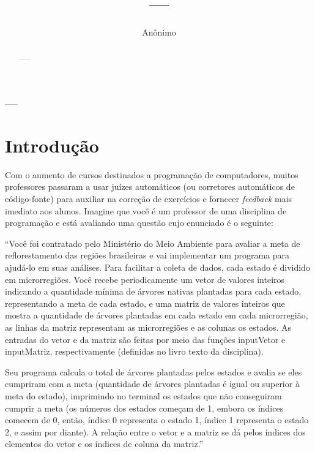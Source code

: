 \documentclass[12pt]{article}
\title{---}
\author{Anônimo}
\begin{document}
 

\maketitle

\begin{abstract}
  -----
\end{abstract}
     
\begin{resumo}
  -----
\end{resumo}


\section{Introdução}\label{Introducao}

Com o aumento de cursos destinados a programação de computadores, muitos 
professores passaram a usar juízes automáticos (ou corretores automáticos de 
código-fonte) para auxiliar na correção de exercícios e fornecer 
\textit{feedback} mais imediato aos alunos. Imagine que você é um professor de
uma disciplina de programação e está avaliando uma questão cujo enunciado é o
seguinte:

``Você foi contratado pelo Ministério do Meio Ambiente para avaliar a meta de 
reflorestamento das regiões brasileiras e vai implementar um programa para 
ajudá-lo em suas análises. Para facilitar a coleta de dados, cada estado é 
dividido em microrregiões. Você recebe periodicamente um vetor de valores 
inteiros indicando a quantidade mínima de árvores nativas plantadas para cada 
estado, representando a meta de cada estado, e uma matriz de valores inteiros 
que mostra a quantidade de árvores plantadas em cada estado em cada microrregião,
as linhas da matriz representam as microrregiões e as colunas os estados. 
As entradas do vetor e da matriz são feitas por meio das funções inputVetor e 
inputMatriz, respectivamente (definidas no livro texto da disciplina).

Seu programa calcula o total de árvores plantadas pelos estados e avalia se eles 
cumpriram com a meta (quantidade de árvores plantadas é igual ou superior à meta 
do estado), imprimindo no terminal os estados que não conseguiram cumprir a meta 
(os números dos estados começam de 1, embora os índices comecem de 0, então, índice 
0 representa o estado 1, índice 1 representa o estado 2, e assim por diante). 
A relação entre o vetor e a matriz se dá pelos índices dos elementos do vetor e os 
índices de coluna da matriz.''
\end{document}
